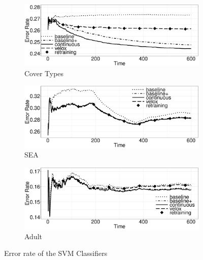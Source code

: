 \documentclass[10pt,conference,letterpaper]{IEEEtran}
\begin{document}
\begin{figure}[h]
	\centering
\begin{subfigure}[b]{\columnwidth}
	\includegraphics[width=\columnwidth]{../images/experiment-results/cover-types-quality.eps}
	\caption{Cover Types}
	\label{fig:cover-types-quality}
\end{subfigure}
\begin{subfigure}[b]{\columnwidth}
  	\includegraphics[width=\columnwidth]{../images/experiment-results/sea-quality.eps}
	\caption{SEA}
	\label{fig:sea-quality}
\end{subfigure}
\begin{subfigure}[b]{\columnwidth}
  	\includegraphics[width=\columnwidth]{../images/experiment-results/adult-quality.eps}
	\caption{Adult}
	\label{fig:adult-quality}
\end{subfigure}
\vspace{2mm}
\caption{Error rate of the SVM Classifiers}
\label{fig:local-classification-results}
\end{figure}
\end{document}
